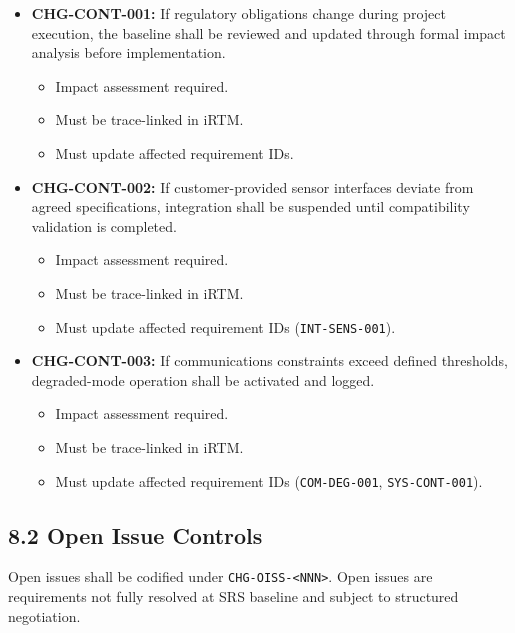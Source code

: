 \documentclass[11pt,a4paper]{article}
\begin{document}
\begin{itemize}[leftmargin=*]
  \item \textbf{CHG-CONT-001:} If regulatory obligations change during project execution, the baseline shall be reviewed and updated through formal impact analysis before implementation.
  \begin{itemize}[nosep]
    \item Impact assessment required.
    \item Must be trace-linked in iRTM.
    \item Must update affected requirement IDs.
  \end{itemize}

  \item \textbf{CHG-CONT-002:} If customer-provided sensor interfaces deviate from agreed specifications, integration shall be suspended until compatibility validation is completed.
  \begin{itemize}[nosep]
    \item Impact assessment required.
    \item Must be trace-linked in iRTM.
    \item Must update affected requirement IDs (\texttt{INT-SENS-001}).
  \end{itemize}

  \item \textbf{CHG-CONT-003:} If communications constraints exceed defined thresholds, degraded-mode operation shall be activated and logged.
  \begin{itemize}[nosep]
    \item Impact assessment required.
    \item Must be trace-linked in iRTM.
    \item Must update affected requirement IDs (\texttt{COM-DEG-001}, \texttt{SYS-CONT-001}).
  \end{itemize}
\end{itemize}

\subsection{8.2 Open Issue Controls}

Open issues shall be codified under \texttt{CHG-OISS-<NNN>}. Open issues are requirements not fully resolved at SRS baseline and subject to structured negotiation.
\end{document}
